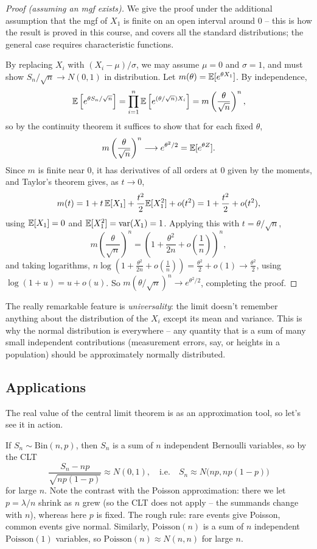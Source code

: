 \documentclass[a4paper]{scrartcl}
\begin{document}
\begin{proof}[Proof (assuming an mgf exists)]
	We give the proof under the additional assumption that the mgf of $X_1$ is finite on an open interval around $0$ -- this is how the result is proved in this course, and covers all the standard distributions; the general case requires characteristic functions.

	By replacing $X_i$ with $(X_i - \mu)/\sigma$, we may assume $\mu = 0$ and $\sigma = 1$, and must show $S_n/\sqrt{n} \rightarrow N(0, 1)$ in distribution. Let $m(\theta) = \mathbb{E}[e^{\theta X_1}]$. By independence,
	$$
	\mathbb{E}\left[e^{\theta S_n / \sqrt{n}}\right] = \prod_{i = 1}^{n}\mathbb{E}\left[e^{(\theta/\sqrt{n})X_i}\right] = m\left(\frac{\theta}{\sqrt{n}}\right)^{n},
	$$
	so by the continuity theorem it suffices to show that for each fixed $\theta$,
	$$
	m\left(\frac{\theta}{\sqrt{n}}\right)^{n} \longrightarrow e^{\theta^2/2} = \mathbb{E}[e^{\theta Z}].
	$$
	Since $m$ is finite near $0$, it has derivatives of all orders at $0$ given by the moments, and Taylor's theorem gives, as $t \rightarrow 0$,
	$$
	m(t) = 1 + t\,\mathbb{E}[X_1] + \frac{t^2}{2}\mathbb{E}[X_1^2] + o(t^2) = 1 + \frac{t^2}{2} + o(t^2),
	$$
	using $\mathbb{E}[X_1] = 0$ and $\mathbb{E}[X_1^2] = \operatorname{var}(X_1) = 1$. Applying this with $t = \theta/\sqrt{n}$,
	$$
	m\left(\frac{\theta}{\sqrt{n}}\right)^n = \left(1 + \frac{\theta^2}{2n} + o\left(\frac1n\right)\right)^{n},
	$$
	and taking logarithms, $n \log\left(1 + \frac{\theta^2}{2n} + o(\frac1n)\right) = \frac{\theta^2}{2} + o(1) \rightarrow \frac{\theta^2}{2}$, using $\log(1 + u) = u + o(u)$. So $m(\theta/\sqrt{n})^n \rightarrow e^{\theta^2/2}$, completing the proof.
\end{proof}

The really remarkable feature is \emph{universality}: the limit doesn't remember anything about the distribution of the $X_i$ except its mean and variance. This is why the normal distribution is everywhere -- any quantity that is a sum of many small independent contributions (measurement errors, say, or heights in a population) should be approximately normally distributed.

\subsection{Applications}

The real value of the central limit theorem is as an approximation tool, so let's see it in action.

\begin{example}
	If $S_n \sim \mathrm{Bin}(n, p)$, then $S_n$ is a sum of $n$ independent Bernoulli variables, so by the CLT
	$$
	\frac{S_n - np}{\sqrt{np(1-p)}} \approx N(0, 1), \quad \text{i.e.} \quad S_n \approx N\big(np, np(1-p)\big)
	$$
	for large $n$. Note the contrast with the Poisson approximation: there we let $p = \lambda/n$ shrink as $n$ grew (so the CLT does not apply -- the summands change with $n$), whereas here $p$ is fixed. The rough rule: rare events give Poisson, common events give normal. Similarly, $\mathrm{Poisson}(n)$ is a sum of $n$ independent $\mathrm{Poisson}(1)$ variables, so $\mathrm{Poisson}(n) \approx N(n, n)$ for large $n$.
\end{example}
\end{document}
